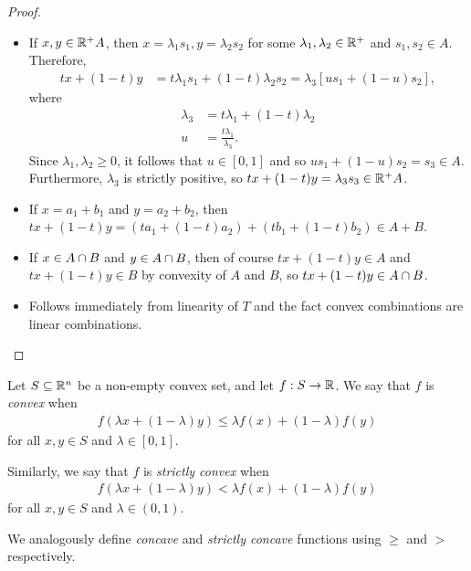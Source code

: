 \begin{proof}\proofbreak
    \begin{itemize}
        \item If $x, y \in \mathbb{R}^{+}A$, then $x = \lambda_1s_1, y = \lambda_2s_2$ for some $\lambda_1, \lambda_2 \in \mathbb{R}^+$ and $s_1, s_2 \in A$. Therefore,
        \begin{align*}
            tx + (1-t)y &= t\lambda_1s_1 + (1 - t)\lambda_2s_2 = \lambda_3\left[us_1 + (1-u)s_2\right],
        \end{align*}
        where
        \begin{align*}
            \lambda_3 &= t\lambda_1 + (1-t)\lambda_2 \\
            u &= \frac{t\lambda_1}{\lambda_3}.
        \end{align*}
        Since $\lambda_1, \lambda_2 \geq 0$, it follows that $u \in [0, 1]$ and so $us_1 + (1-u)s_2 = s_3 \in A$. Furthermore, $\lambda_3$ is strictly positive, so $tx + (1-t)y = \lambda_3s_3 \in \mathbb{R}^{+}A$.
        \item If $x = a_1 + b_1$ and $y = a_2 + b_2$, then $tx + (1-t)y = (ta_1 + (1-t)a_2) + (tb_1 + (1-t)b_2) \in A + B$.
        \item If $x \in A \cap B$ and $y \in A \cap B$, then of course $tx + (1-t)y \in A$ and $tx + (1-t)y \in B$ by convexity of $A$ and $B$, so $tx + (1-t)y \in A \cap B$.
        \item Follows immediately from linearity of $T$ and the fact convex combinations are linear combinations.
    \end{itemize}
\end{proof}

\begin{defn}
    Let $S \subseteq \mathbb{R}^n$ be a non-empty convex set, and let $f: S \to \mathbb{R}$. We say that $f$ is \emph{convex} when
    \begin{align*}
        f\left(\lambda x + (1 - \lambda)y\right) \leq \lambda f(x) + (1 - \lambda)f(y)
    \end{align*}
    for all $x, y \in S$ and $\lambda \in [0, 1]$.

    Similarly, we say that $f$ is \emph{strictly convex} when
    \begin{align*}
        f\left(\lambda x + (1 - \lambda)y\right) < \lambda f(x) + (1 - \lambda)f(y)
    \end{align*}
    for all $x, y \in S$ and $\lambda \in (0, 1)$.

    We analogously define \emph{concave} and \emph{strictly concave} functions using $\geq$ and $>$ respectively.
\end{defn}

